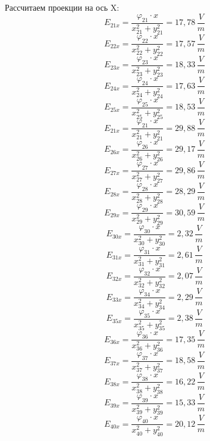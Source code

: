 \documentclass[a4paper,12pt]{report}
\begin{document}
Рассчитаем проекции на ось X:
\[ E_{21x} = \frac{\varphi_{21}\cdot x}{x_{21}^2+y_{21}^2} = 17,78 \, \frac{V}{m} \]
\[ E_{22x} = \frac{\varphi_{22}\cdot x}{x_{22}^2+y_{22}^2} = 17,57 \, \frac{V}{m} \]
\[ E_{23x} = \frac{\varphi_{23}\cdot x}{x_{23}^2+y_{23}^2} = 18,33 \, \frac{V}{m} \]
\[ E_{24x} = \frac{\varphi_{24}\cdot x}{x_{24}^2+y_{24}^2} = 17,63 \, \frac{V}{m} \]
\[ E_{25x} = \frac{\varphi_{25}\cdot x}{x_{25}^2+y_{25}^2} = 18,53 \, \frac{V}{m} \]
\[ E_{21x} = \frac{\varphi_{21}\cdot x}{x_{21}^2+y_{21}^2} = 29,88 \, \frac{V}{m} \]
\[ E_{26x} = \frac{\varphi_{26}\cdot x}{x_{26}^2+y_{26}^2} = 29,17 \, \frac{V}{m} \]
\[ E_{27x} = \frac{\varphi_{27}\cdot x}{x_{27}^2+y_{27}^2} = 29,86 \, \frac{V}{m} \]
\[ E_{28x} = \frac{\varphi_{28}\cdot x}{x_{28}^2+y_{28}^2} = 28,29 \, \frac{V}{m} \]
\[ E_{29x} = \frac{\varphi_{29}\cdot x}{x_{29}^2+y_{29}^2} = 30,59 \, \frac{V}{m} \]
\[ E_{30x} = \frac{\varphi_{30}\cdot x}{x_{30}^2+y_{30}^2} = 2,32 \, \frac{V}{m} \]
\[ E_{31x} = \frac{\varphi_{31}\cdot x}{x_{31}^2+y_{31}^2} = 2,61 \, \frac{V}{m} \]
\[ E_{32x} = \frac{\varphi_{32}\cdot x}{x_{32}^2+y_{32}^2} = 2,07 \, \frac{V}{m} \]
\[ E_{33x} = \frac{\varphi_{34}\cdot x}{x_{34}^2+y_{34}^2} = 2,29 \, \frac{V}{m} \]
\[ E_{35x} = \frac{\varphi_{35}\cdot x}{x_{35}^2+y_{35}^2} = 2,38 \, \frac{V}{m} \]
\[ E_{36x} = \frac{\varphi_{36}\cdot x}{x_{36}^2+y_{36}^2} = 17,35 \, \frac{V}{m} \]
\[ E_{37x} = \frac{\varphi_{37}\cdot x}{x_{37}^2+y_{37}^2} = 18,58 \, \frac{V}{m} \]
\[ E_{38x} = \frac{\varphi_{38}\cdot x}{x_{38}^2+y_{38}^2} = 16,22 \, \frac{V}{m} \]
\[ E_{39x} = \frac{\varphi_{39}\cdot x}{x_{39}^2+y_{39}^2} = 15,33\, \frac{V}{m} \]
\[ E_{40x} = \frac{\varphi_{40}\cdot x}{x_{40}^2+y_{40}^2} = 20,12 \, \frac{V}{m} \]
\end{document}
